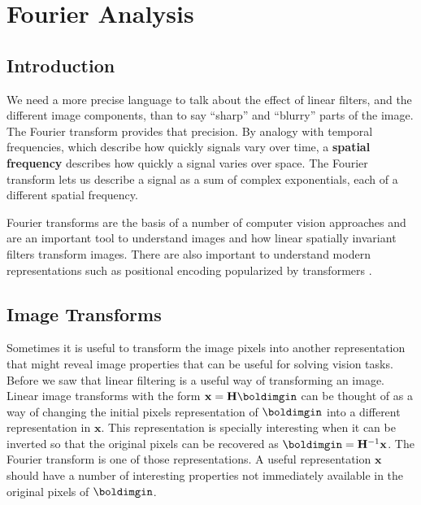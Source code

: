 \chapter{Fourier Analysis}
\label{chapter:fourier_analysis}


\section{Introduction}

We need a more precise language to talk about the effect of
linear filters, and the different image components, than to say
``sharp'' and ``blurry'' parts of the image.    The Fourier transform
provides that precision. By analogy with temporal frequencies, which describe how quickly signals vary over time,
a {\bf spatial frequency} describes how quickly a signal varies over space.
The Fourier transform lets us describe a signal as a sum of complex
exponentials, each of a different spatial frequency.

Fourier transforms are the basis of a number of computer vision approaches and are an important tool to understand images and how linear spatially invariant filters transform images. There are also important to understand modern representations such as positional encoding popularized by transformers \cite{vaswani2017attention}.

\section{Image Transforms}

Sometimes it is useful to transform the image pixels into another representation that might reveal image properties that can be useful for solving vision tasks. Before we saw that linear filtering is a useful way of transforming an image. Linear image transforms with the form $\mathbf{x} =  \mathbf{H} \boldimgin$ can be thought of as a way of changing the initial pixels representation of $\boldimgin$ into a different representation in $\mathbf{x}$.
This representation is specially interesting when it  can  be inverted so that the original pixels can be recovered as $\boldimgin =  \mathbf{H}^{-1} \mathbf{x}$. The Fourier transform is one of those representations. A useful representation $\mathbf{x}$ should have a number of interesting properties not immediately available in the original pixels of $\boldimgin$.




